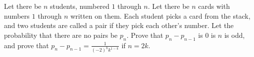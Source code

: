 Let there be $n$ students, numbered $1$ through $n$. Let there be $n$ cards with numbers $1$ through $n$ written on them. Each student picks a card from the stack, and two students are called a pair if they pick each other's number. Let the probability that there are no pairs be $p_n$.
Prove that $p_n - p_{n-1}$ is $0$ is $n$ is odd, and
prove that  $p_n - p_{n-1}= \frac{1}{(-2)^kk^{1-k}}$ if $n = 2k$.